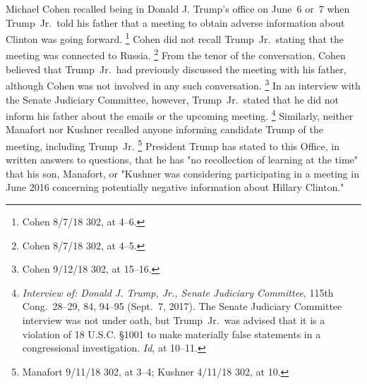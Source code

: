 Michael Cohen recalled being in Donald J. Trump's office on June~6 or~7 when Trump~Jr.\ told his father that a meeting to obtain adverse information about Clinton was going forward.%
\footnote{Cohen 8/7/18 302, at 4--6.}
Cohen did not recall Trump~Jr.\ stating that the meeting was connected to Russia.%
\footnote{Cohen 8/7/18 302, at 4--5.}
From the tenor of the conversation, Cohen believed that Trump~Jr.\ had previously discussed the meeting with his father, although Cohen was not involved in any such conversation.%
\footnote{Cohen 9/12/18 302, at 15--16.}
In an interview with the Senate Judiciary Committee, however, Trump~Jr.\ stated that he did not inform his father about the emails or the upcoming meeting.%
\footnote{\textit{Interview of: Donald J. Trump, Jr., Senate Judiciary Committee}, 115th Cong.~28--29, 84, 94--95
(Sept.~7, 2017).
The Senate Judiciary Committee interview was not under oath, but Trump~Jr.\ was advised that it is a violation of 18 U.S.C. \S 1001 to make materially false statements in a congressional investigation.
\textit{Id}, at 10--11.}
Similarly, neither Manafort nor Kushner recalled anyone informing candidate Trump of the meeting, including Trump~Jr.%
\footnote{Manafort 9/11/18 302, at 3--4;
Kushner 4/11/18 302, at 10.}
President Trump has stated to this Office, in written answers to questions, that he has "no recollection of learning at the time" that his son, Manafort, or "Kushner was considering participating in a meeting in June 2016 concerning potentially negative information about Hillary Clinton."%

